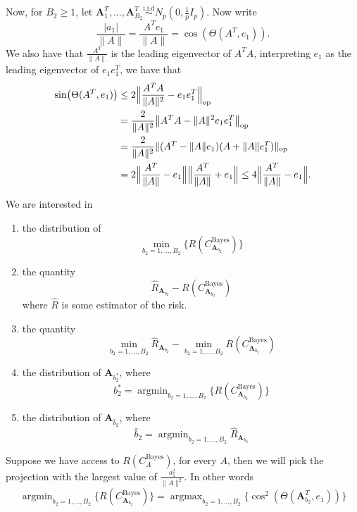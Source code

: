 \documentclass[12pt]{article}
\DeclareMathOperator*{\argmin}{argmin}
\DeclareMathOperator*{\argmax}{argmax}
\begin{document}
Now, for $B_2 \geq 1$, let $\mathbf{A}_1^T, \ldots, \mathbf{A}_{B_2}^T \stackrel{\mathrm{i.i.d}}{\sim} N_p(0, \frac{1}{p} I_p)$. Now write
\[
 \frac{|a_1|}{\|A\|} = \frac{A^T e_1 } {\|A\|} = \cos(\Theta(A^T, e_1)). 
\] 
We also have that $\frac{A^T}{\|A\|}$ is the leading eigenvector of $A^TA$, interpreting $e_1$ as the leading eigenvector of $e_1e_1^T$, we have that 
\begin{align*}
\sin\bigl(\Theta(A^T, e_1)\bigr) &\leq 2\Bigl\|\frac{A^TA}{\|A\|^2} -  e_1e_1^T\Bigr\|_{\mathrm{op} } 
\\ & = \frac{ 2}{\|A\|^2} \bigl\| A^TA - \|A\|^2 e_1e_1^T \bigr\|_{\mathrm{op}} 
\\ & = \frac{2}{\|A\|^2} \| (A^T - \|A\|e_1)(A + \|A\|e_1^T)\|_{\mathrm{op}} 
\\ & = 2\Bigl\|\frac{A^T}{\|A\|} - e_1\Bigr\|\Bigl\|\frac{A^T}{\|A\|} + e_1\Bigr\| \leq 4 \Bigl\|\frac{A^T}{\|A\|} - e_1\Bigr\|.  
\end{align*} 




We are interested in 
\begin{enumerate} 
\item the distribution of 
\[
\min_{b_2 = 1, \ldots, B_2} \{ R(C_{\mathbf{A}_{b_2}}^{\mathrm{Bayes}})\} 
\]
\item the quantity
\[
\hat{R}_{\mathbf{A}_{b_2}} - R(C_{\mathbf{A}_{b_2}}^{\mathrm{Bayes}})
\]
where $\hat{R}$ is some estimator of the risk. 
\item the quantity
\[
\min_{b_2 = 1, \ldots, B_2} \hat{R}_{\mathbf{A}_{b_2}} - \min_{b_2 = 1, \ldots, B_2} R(C_{\mathbf{A}_{b_2}}^{\mathrm{Bayes}})
\]
\item the distribution of $\mathbf{A}_{b^*_2}$, where 
\[
b^*_2 = \argmin_{b_2 = 1, \ldots, B_2}  \{ R(C_{\mathbf{A}_{b_2}}^{\mathrm{Bayes}})\} 
\]
\item the distribution of $\mathbf{A}_{\hat{b}_2}$, where 
\[
\hat{b}_2 = \argmin_{b_2 = 1, \ldots, B_2} \hat{R}_{\mathbf{A}_{b_2}} 
\]
\end{enumerate} 

Suppose we have access to $R(C_{A}^{\mathrm{Bayes}})$, for every $A$, then we will pick the projection with the largest value of $\frac{a_1^2}{\|A\|^2}$. In other words 
\[
\argmin_{b_2 = 1, \ldots, B_2} \{ R(C_{\mathbf{A}_{b_2}}^{\mathrm{Bayes}})\} = \argmax_{b_2 = 1, \ldots, B_2} \{\cos^2(\Theta(\mathbf{A}_{b_2}^T, e_1))\} 
\]
\end{document}
